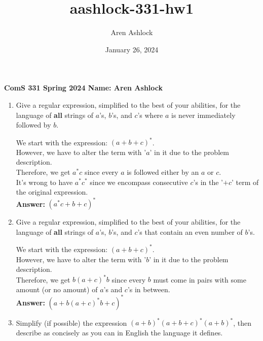 \documentclass[12pt]{article}
\title{aashlock-331-hw1}
\author{Aren Ashlock}
\date{January 26, 2024}
\begin{document}
\noindent\textbf{ComS 331 \quad Spring 2024 \quad Name: Aren Ashlock}

\begin{enumerate}


\item Give a regular expression, simplified to the best of your abilities, for the language of \textbf{all} strings of $a$'s, $b$'s, and $c$'s where $a$ is never immediately followed by $b$.

We start with the expression: $(a + b + c)^*$.\\
However, we have to alter the term with '$a$' in it due to the problem description.\\
Therefore, we get $a^*c$ since every $a$ is followed either by an $a$ or $c$.\\
It's wrong to have $a^*c^*$ since we encompass consecutive $c$'s in the '$+ c$' term of the original expression.\\
\textbf{Answer:} $(a^*c + b + c)^*$



\item Give a regular expression, simplified to the best of your abilities, for the language of \textbf{all} strings of $a$'s, $b$'s, and $c$'s that contain an even number of $b$'s.

We start with the expression: $(a + b + c)^*$.\\
However, we have to alter the term with '$b$' in it due to the problem description.\\
Therefore, we get $b(a + c)^*b$ since every $b$ must come in pairs with some amount (or no amount) of $a$'s and $c$'s in between.\\
\textbf{Answer:} $(a + b(a + c)^*b + c)^*$



\item Simplify (if possible) the expression $(a + b)^*(a + b + c)^*(a + b)^*$, then describe as concisely as you can in English the language it defines.


\end{enumerate}
\end{document}
